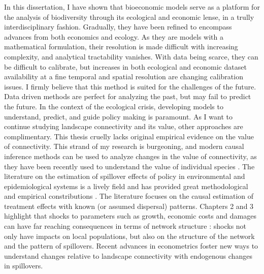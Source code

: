 In this dissertation, I have shown that bioeconomic models serve as a platform for the analysis of biodiversity through its ecological and economic lense, in a trully interdisciplinary fashion. Gradually, they have been refined to encompass advances from both economics and ecology. As they are models with a mathematical formulation, their resolution is made difficult with increasing complexity, and analytical tractability vanishes. With data being scarce, they can be difficult to calibrate, but increases in both ecological and economic dataset availability at a fine temporal and spatial resolution are changing calibration issues. I firmly believe that this method is suited for the challenges of the future. Data driven methods are perfect for analyzing the past, but may fail to predict the future. In the context of the ecological crisis, developing models to understand, predict, and guide policy making is paramount. As I want to continue studying landscape connectivity and its value, other approaches are complimentary. This thesis cruelly lacks original empirical evidence on the value of connectivity. This strand of my research is burgeoning, and modern causal inference methods can be used to analyze changes in the value of connectivity, as they have been recently used to understand the value of individual species \citep{frank_economic_2024, frank_social_nodate}. The literature on the estimation of spillover effects of policy in environmental and epidemiological systems is a lively field and has provided great methodological and empirical constributions \citep{deschenes_quasi-experimental_2018,reich_review_2021}. The literature focuses on the causal estimation of treatment effects with known (or assumed dispersal) patterns. Chapters 2 and 3 highlight that shocks to parameters such as growth, economic costs and damages can have far reaching consequences in terms of network structure : shocks not only have impacts on local populations, but also on the structure of the network and the pattern of spillovers. Recent advances in econometrics \citep{comola_treatment_2021} foster new ways to understand changes relative to landscape connectivity with endogenous changes in spillovers. \\



\clearpage
{\footnotesize


}